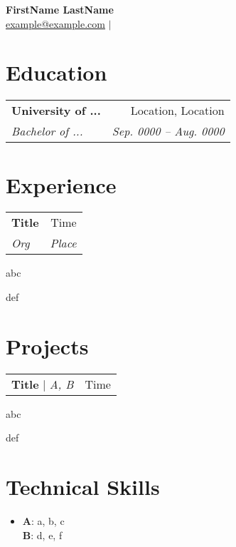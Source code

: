 \documentclass[letterpaper,11pt]{article}
\makeatletter
\newenvironment{lrtable}
  {\begin{tabular*}{0.97\textwidth}{l@{\extracolsep{\fill}}r}}
  {\end{tabular*}}
\newcommand{\subheading}[4]{
  \begin{lrtable}
    {\bf #1} & {#2} \\
    {\it\small {#3}} & {\it\small {#4}}
  \end{lrtable}
}
\newcommand{\projectheading}[2]{
  \begin{lrtable}
    \small {#1} & {#2}
  \end{lrtable}
}
\makeatother
\begin{document}
\begin{center}
  {\bf\huge FirstName LastName} \\ \vspace{2pt}
  \small
  \href{mailto:example@example.com}{\underline{example@example.com}} $|$ 
\end{center}

\section{Education}
\begin{resumelist}
  \item \subheading
    {University of ...}{Location, Location}
    {Bachelor of ...}{Sep. 0000 -- Aug. 0000}
\end{resumelist}

\section{Experience}
\begin{resumelist}
  \item \subheading
    {Title}{Time}
    {Org}{Place}
    \begin{resumesublist}
      \item abc
      \item def
    \end{resumesublist}
\end{resumelist}

\section{Projects}
\begin{resumelist}
  \item \projectheading
    {{\bf Title} $|$ {\it A, B}}{Time}
    \begin{resumesublist}
      \item abc
      \item def
    \end{resumesublist}
\end{resumelist}

\section{Technical Skills}
\begin{itemize}[leftmargin=0.15in]
  \item[] \small
    \textbf{A}{: a, b, c} \\
    \textbf{B}{: d, e, f}
\end{itemize}
\end{document}

